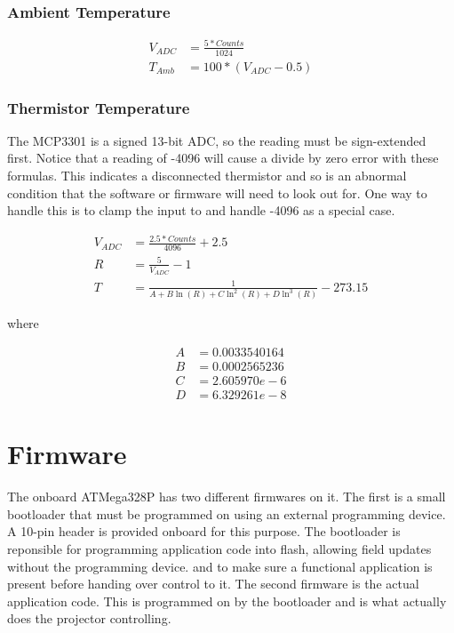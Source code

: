 \documentclass{article}
\begin{document}
\subsubsection{Ambient Temperature}
\begin{align*}
    V_{ADC} &= \frac{5 * Counts}{1024} \\
    T_{Amb} &= 100 * (V_{ADC} - 0.5)
\end{align*}

\subsubsection{Thermistor Temperature}
The MCP3301 is a signed 13-bit ADC, so the reading must be sign-extended first.  Notice that a
reading of -4096 will cause a divide by zero error with these formulas.  This indicates a
disconnected thermistor and so is an abnormal condition that the software or firmware will need to
look out for.  One way to handle this is to clamp the input to  and handle -4096 as a
special case.

\begin{align*}
    V_{ADC} &= \frac{2.5 * Counts}{4096} + 2.5 \\
    R &= \frac{5}{V_{ADC}} - 1 \\
    T &= \frac{1}{A + B\ln(R) + C\ln^2(R) + D\ln^3(R)} - 273.15
\end{align*}

where

\begin{align*}
    A &= 0.0033540164 \\
    B &= 0.0002565236 \\
    C &= 2.605970e-6 \\
    D &= 6.329261e-8
\end{align*}


\section{Firmware} \label{sec:Firmware}
The onboard ATMega328P has two different firmwares on it.  The first is a small bootloader that must
be programmed on using an external programming device.  A 10-pin header is provided onboard for this
purpose.  The bootloader is reponsible for programming application code into flash, allowing field
updates without the programming device. and to make sure a functional application is present before
handing over control to it.  The second firmware is the actual application code.  This is programmed
on by the bootloader and is what actually does the projector controlling.
\end{document}
